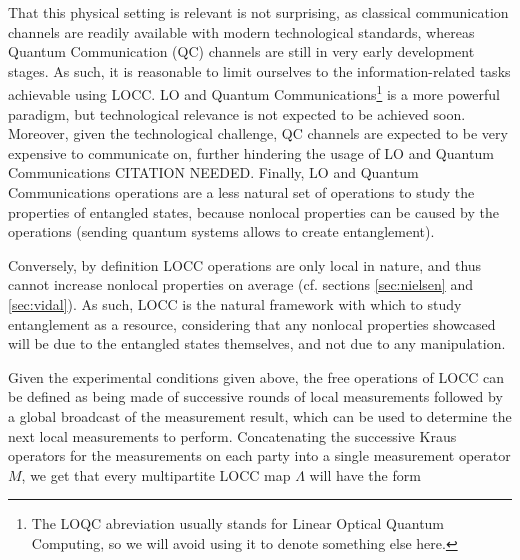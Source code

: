 That this physical setting is relevant is not surprising, as classical communication channels are readily available with modern technological standards, whereas Quantum Communication (QC) channels are still in very early development stages. As such, it is reasonable to limit ourselves to the information-related tasks achievable using LOCC. LO and Quantum Communications\footnote{The LOQC abreviation usually stands for Linear Optical Quantum Computing, so we will avoid using it to denote something else here.} is a more powerful paradigm, but technological relevance is not expected to be achieved soon. Moreover, given the technological challenge, QC channels are expected to be very expensive to communicate on, further hindering the usage of LO and Quantum Communications CITATION NEEDED.  Finally, LO and Quantum Communications operations are a less natural set of operations to study the properties of entangled states, because nonlocal properties can be caused by the operations (sending quantum systems allows to create entanglement).

Conversely, by definition LOCC operations are only local in nature, and thus cannot increase nonlocal properties on average (cf. sections \ref{sec:nielsen} and \ref{sec:vidal}). As such, LOCC is the natural framework with which to study entanglement as a resource, considering that any nonlocal properties showcased will be due to the entangled states themselves, and not due to any manipulation.

Given the experimental conditions given above, the free operations of LOCC can be defined as being made of successive rounds of local measurements followed by a global broadcast of the measurement result, which can be used to determine the next local measurements to perform. %
Concatenating the successive Kraus operators for the measurements on each party into a single measurement operator $M$, we get that every multipartite LOCC map $\Lambda$ will have the form

